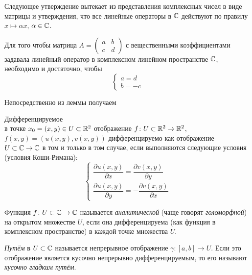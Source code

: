 Следующее утверждение вытекает из представления комплексных чисел в виде матрицы и утверждения,
что все линейные операторы в $\mathbb{C}$ действуют по правилу $x \mapsto \alpha x$, 
$\alpha \in \mathbb{C}$.

\begin{lemma}
    Для того чтобы матрица $A = \begin{pmatrix}
    a & b \\
    c & d 
    \end{pmatrix}$ с вещественными коэффициентами задавала
    линейный оператор в комплексном линейном пространстве $\mathbb{C}$, необходимо и достаточно, чтобы
    \[ \left\{\begin{array}{l}
        a = d \\
        b = -c
        \end{array}\right.\]
\end{lemma}

Непосредственно из леммы получаем
\begin{theorem}
    Дифференцируемое \\ в точке $x_0 = (x, y) \in U \subset \mathbb{R}^2$ 
    отображение $f \colon U \subset \mathbb{R}^2 \to \mathbb{R}^2$,
    $f(x, y) = (u(x, y), v(x, y))$
    дифференцируемо как отображение $U \subset \mathbb{C} \to \mathbb{C}$ в том и только в том случае, если выполняются следующие условия (условия Коши-Римана):
    \[ \left\{\begin{array}{l}
        \dfrac{\partial u(x, y)}{\partial x} 
            = \dfrac{\partial v(x, y)}{\partial y} \\
        \dfrac{\partial u(x, y)}{\partial y}
            = -\dfrac{\partial v(x, y)}{\partial x}
        \end{array}\right. \]
\end{theorem}

\begin{definition}
    Функция $f \colon U \subset \mathbb{C} \to \mathbb{C}$ называется \emph{аналитической} 
    (чаще говорят \emph{голоморфной}) на открытом множестве $U$, если она дифференцируема 
    (как функция в комплексном пространстве) 
    в каждой точке множества $U$. 
\end{definition}

\begin{definition}
    \emph{Путём} в $U \subset \mathbb{C}$ называется непрерывное отображение
    $\gamma \colon [a, b] \to U$. Если это отображение является кусочно непрерывно
    дифференцируемым, то его называют \emph{кусочно гладким путём}.
\end{definition}

